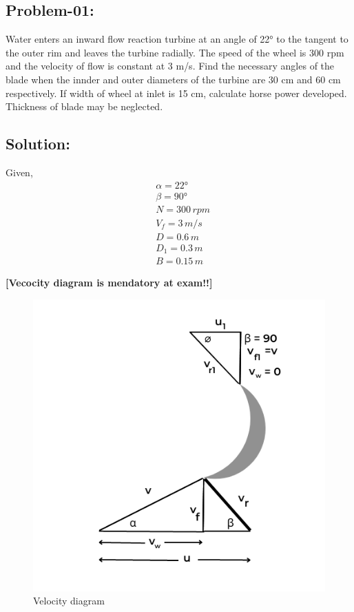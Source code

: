 \documentclass{article}
\begin{document}
\begin{multicols}{2}
\subsection*{Problem-01:}
Water enters an inward flow reaction turbine at an angle of 22° to the tangent to the outer rim and leaves the turbine radially. The speed of the wheel is 300 rpm and the velocity of flow is constant at 3 m/s. Find the necessary angles of the blade when the innder and outer diameters of the turbine are 30 cm and 60 cm respectively. If width of wheel at inlet is 15 cm, calculate horse power developed. Thickness of blade may be neglected.

\subsection*{Solution:}
Given,
\begin{align*}
  & \alpha = 22° \\
  & \beta = 90° \\
  & N = 300 \, rpm \\
  & V_f = 3 \, m/s \\
  & D = 0.6 \, m \\
  & D_1 = 0.3 \, m \\
  & B = 0.15 \, m 
\end{align*}

\textbf{[Vecocity diagram is mendatory at exam!!]}

\begin{figure}[H]
  \includegraphics[width=0.97\linewidth]{img/velo_dia_prb.png}
  \caption{Velocity diagram}
\end{figure}


\end{multicols}
\end{document}
